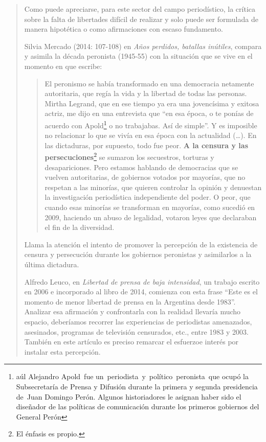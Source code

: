 \begin{quote}
Como puede apreciarse, para este sector del campo periodístico, la crítica sobre la falta de libertades difícil de realizar y solo puede ser formulada de manera hipotética o como afirmaciones con escaso fundamento.

Silvia Mercado (2014: 107-108) en \emph{Años perdidos, batallas inútiles}, compara y asimila la década peronista (1945-55) con la situación que se vive en el momento en que escribe:

\begin{quote}
	El peronismo se había transformado en una democracia netamente autoritaria, que regía la vida y la libertad de todas las personas. Mirtha Legrand, que en ese tiempo ya era una jovencísima y exitosa actriz, me dijo en una entrevista que \enquote{en esa época, o te ponías de acuerdo con Apold\footnote{aúl Alejandro Apold fue un periodista y político peronista que ocupó la Subsecretaría de Prensa y Difusión durante la primera y segunda presidencia de Juan Domingo Perón. Algunos historiadores le asignan haber sido el diseñador de las políticas de comunicación durante los primeros gobiernos del General Perón} o no trabajabas. Así de simple}. Y es imposible no relacionar lo que se vivía en esa época con la actualidad (\dots). En las dictaduras, por supuesto, todo fue peor. \textbf{A la censura y las persecuciones}\footnote{El énfasis es propio.} se sumaron los secuestros, torturas y desapariciones. Pero estamos hablando de democracias que se vuelven autoritarias, de gobiernos votados por mayorías, que no respetan a las minorías, que quieren controlar la opinión y denuestan la investigación periodística independiente del poder. O peor, que cuando esas minorías se transforman en mayorías, como sucedió en 2009, haciendo un abuso de legalidad, votaron leyes que declaraban el fin de la diversidad.
\end{quote}


Llama la atención el intento de promover la percepción de la existencia de censura y persecución durante los gobiernos peronistas y asimilarlos a la última dictadura.

Alfredo Leuco, en \emph{Libertad de prensa de baja intensidad}, un trabajo escrito en 2006 e incorporado al libro de 2014, comienza con esta frase \enquote{Este es el momento de menor libertad de prensa en la Argentina desde 1983}. Analizar esa afirmación y confrontarla con la realidad llevaría mucho espacio, deberíamos recorrer las experiencias de periodistas amenazados, asesinados, programas de televisión censurados, etc., entre 1983 y 2003. También en este artículo es preciso remarcar el esfuerzoe interés por instalar esta percepción.


\end{quote}
